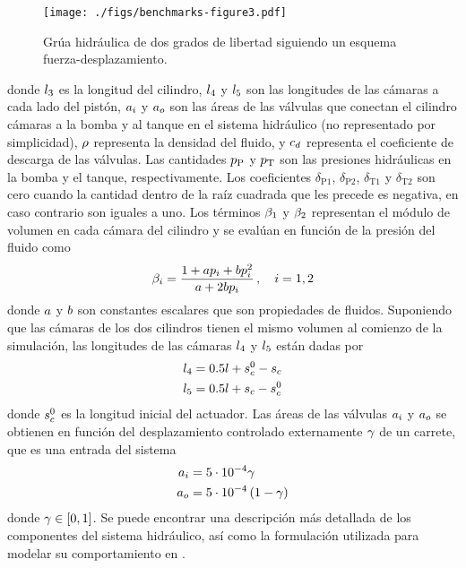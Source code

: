 \begin{figure}[ht!]\centering
	\texttt{[image: ./figs/benchmarks-figure3.pdf]}
	\caption{Grúa hidráulica de dos grados de libertad siguiendo un esquema fuerza-desplazamiento.}
	\label{fig:GruaCosim}
\end{figure}
%
donde $l_3$ es la longitud del cilindro, $l_4$ y $l_5$ son las longitudes de las cámaras a cada lado del pistón, $a_i$ y $a_o$ son las áreas de las válvulas que conectan el cilindro cámaras a la bomba y al tanque en el sistema hidráulico (no representado por simplicidad), $\rho$ representa la densidad del fluido, y $c_d$ representa el coeficiente de descarga de las válvulas.
Las cantidades $p_{\text{P}}$ y $p_{\text{T}}$ son las presiones hidráulicas en la bomba y el tanque, respectivamente.
Los coeficientes $\delta_{\text{P1}}$, $\delta_{\text{P2}}$, $\delta_{\text{T1}}$ y $\delta_{\text{T2}}$ son cero cuando la cantidad dentro de la raíz cuadrada que les precede es negativa, en caso contrario son iguales a uno.
Los términos $\beta_1$ y $\beta_2$ representan el módulo de volumen en cada cámara del cilindro y se evalúan en función de la presión del fluido como
%
\begin{equation}
	\beta_i = \dfrac{1+a p_i+b p_i^2}{a+2b p_i}\,, \quad i=1,2
	\label{eq:bulkModulus}
\end{equation}
%
donde $a$ y $b$ son constantes escalares que son propiedades de fluidos.
Suponiendo que las cámaras de los dos cilindros tienen el mismo volumen al comienzo de la simulación, las longitudes de las cámaras $l_4$ y $l_5$ están dadas por
%
\begin{align}
	l_4 &= 0.5 l + s_c^0 - s_c\\
	l_5 &= 0.5 l + s_c - s_c^0
	\label{eq:chamberLengths}	
\end{align}
%
donde $s_c^0$ es la longitud inicial del actuador.
Las áreas de las válvulas $a_i$ y $a_o$ se obtienen en función del desplazamiento controlado externamente $\gamma$ de un carrete, que es una entrada del sistema
%
\begin{align}
	a_i &= 5 \cdot 10^{-4} \gamma\\
	a_o &= 5 \cdot 10^{-4} \left( 1-\gamma \right)
	\label{eq:ValveAreas}
\end{align}
%
donde $\gamma\in\left[ 0,1 \right]$.
Se puede encontrar una descripción más detallada de los componentes del sistema hidráulico, así como la formulación utilizada para modelar su comportamiento en \cite{Peiret2018}.

